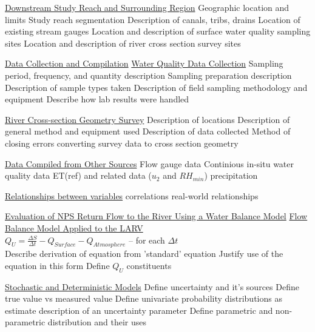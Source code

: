 \documentclass[12pt]{article}
\begin{document}
\begin{outline}[enumerate]
		\2 \underline{Downstream Study Reach and Surrounding Region}
			\3 Geographic location and limits
			\3 Study reach segmentation
			\3 Description of canals, tribs, drains
			\3 Location of existing stream gauges
			\3 Location and description of surface water quality sampling sites
			\3 Location and description of river cross section survey sites

	\1 \underline{Data Collection and Compilation}
		\2 \underline{Water Quality Data Collection}
			\3 Sampling period, frequency, and quantity description
			\3 Sampling preparation description
			\3 Description of sample types taken
			\3 Description of field sampling methodology and equipment
			\3 Describe how lab results were handled

		\2 \underline{River Cross-section Geometry Survey}
			\3 Description of locations
			\3 Description of general method and equipment used
			\3 Description of data collected
			\3 Method of closing errors
			\3 converting survey data to cross section geometry

		\2 \underline{Data Compiled from Other Sources}
			\3 Flow gauge data
			\3 Continious in-situ water quality data
			\3 ET(ref) and related data ($u_2$ and $RH_{min}$)
			\3 precipitation
			
		\2 \underline{Relationships between variables}
			\3 correlations
			\3 real-world relationships

	\1 \underline{Evaluation of NPS Return Flow to the River Using a Water Balance Model}
		\2 \underline{Flow Balance Model Applied to the LARV}\\
		$Q_{U}=\frac{\Delta S}{\Delta t}-Q_{Surface}-Q_{Atmosphere} $ -- for each $\Delta t$ \\
			\3 Describe derivation of equation from 'standard' equation
			\3 Justify use of the equation in this form
			\3 Define $Q_U$ constituents
		
		\2 \underline{Stochastic and Deterministic Models}
			\3 Define uncertainty and it's sources
			\3 Define true value vs measured value
			\3 Define univariate probability distributions as estimate description of an uncertainty parameter
			\3 Define parametric and non-parametric distribution and their uses
		

\end{outline}
\end{document}
